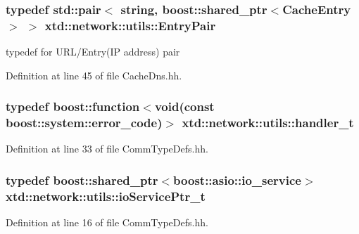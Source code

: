 \hypertarget{namespacextd_1_1network_1_1utils_a1118a93e3ee4c3aba74b90600794145b}{
\subsubsection[{Entry\-Pair}]{\setlength{\rightskip}{0pt plus 5cm}typedef std\-::pair$<$ string, boost\-::shared\-\_\-ptr$<${\bf Cache\-Entry}$>$ $>$ {\bf xtd\-::network\-::utils\-::\-Entry\-Pair}}}\label{namespacextd_1_1network_1_1utils_a1118a93e3ee4c3aba74b90600794145b}


typedef for U\-R\-L/\-Entry(I\-P address) pair 



Definition at line 45 of file Cache\-Dns.\-hh.

\hypertarget{namespacextd_1_1network_1_1utils_ac8a6f796cd645f83cde023d163665bb5}{
\subsubsection[{handler\-\_\-t}]{\setlength{\rightskip}{0pt plus 5cm}typedef boost\-::function$<$void(const boost\-::system\-::error\-\_\-code)$>$ {\bf xtd\-::network\-::utils\-::handler\-\_\-t}}}\label{namespacextd_1_1network_1_1utils_ac8a6f796cd645f83cde023d163665bb5}


Definition at line 33 of file Comm\-Type\-Defs.\-hh.

\hypertarget{namespacextd_1_1network_1_1utils_a67dfba91438896976d636d5aea36c848}{
\subsubsection[{io\-Service\-Ptr\-\_\-t}]{\setlength{\rightskip}{0pt plus 5cm}typedef boost\-::shared\-\_\-ptr$<$boost\-::asio\-::io\-\_\-service$>$ {\bf xtd\-::network\-::utils\-::io\-Service\-Ptr\-\_\-t}}}\label{namespacextd_1_1network_1_1utils_a67dfba91438896976d636d5aea36c848}


Definition at line 16 of file Comm\-Type\-Defs.\-hh.

